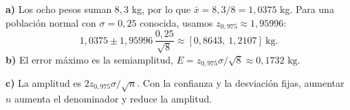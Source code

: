 \textbf{a)} Los ocho pesos suman $8{,}3$ kg, por lo que $\bar x=8{,}3/8=1{,}0375$ kg. Para una población normal con $\sigma=0{,}25$ conocida, usamos $z_{0{,}975}\approx1{,}95996$:
\[
1{,}0375\pm1{,}95996\,\frac{0{,}25}{\sqrt8}
\approx\boxed{[0{,}8643,\ 1{,}2107]}\ \text{kg}.
\]
\textbf{b)} El error máximo es la semiamplitud, $E=z_{0{,}975}\sigma/\sqrt8\approx\boxed{0{,}1732\text{ kg}}$.

\textbf{c)} La amplitud es $2z_{0{,}975}\sigma/\sqrt n$. Con la confianza y la desviación fijas, aumentar $n$ aumenta el denominador y reduce la amplitud.
